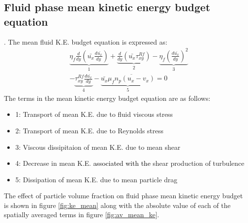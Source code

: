 \documentclass[aip,graphicx]{revtex4-1}
\begin{document}
\subsection{Fluid phase mean kinetic energy budget equation}
\label{sec:mean_ke_budget}
   . The mean fluid K.E. budget equation is expressed as:
    \begin{align}
   & \underbrace{\eta_f\frac{d}{dy}\left(\bar{u_x}\frac{d\bar{u_x}}{d y}\right)}_{1}+\underbrace{\frac{d}{dy}(\bar{u_x}\tau_{xy}^{Rf})}_{2}-\underbrace{\eta_f\left(\frac{d\bar{u_x}}{dy}\right)^2}_{3}\nonumber\\ &-\underbrace{\tau_{xy}^{Rf}\frac{d\bar{u_x}}{dy}}_{4}-\underbrace{\bar{u_x}\overline{\mu_fn_p(u_x-v_x)}}_{5}=0
    \end{align}
    \label{eq:mean_ke}
The terms in the mean kinetic energy budget equation are as follows:   
   \begin{itemize}
   	\item 1: Transport of mean K.E. due to fluid viscous stress
   	\item 2: Transport of mean K.E. due to Reynolds stress
   	\item 3: Viscous dissipitaion of mean K.E. due to mean shear
   	\item 4: Decrease in mean K.E. \textcolor{black}{associated with the} shear production of turbulence
   	\item 5: Dissipation of mean K.E. due to mean particle drag
   \end{itemize}
The effect of particle volume fraction on fluid phase mean kinetic energy budget is shown in figure \ref{fig:ke_mean} along with the absolute value of each of the spatially averaged terms in figure \ref{fig:av_mean_ke}.
\end{document}
